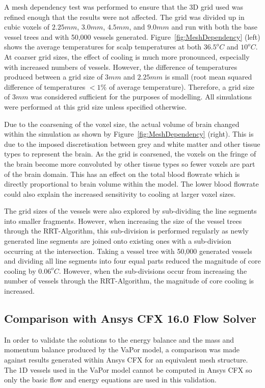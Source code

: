 \documentclass[11pt,english,a4paper,twoside,openright]{report}
\begin{document}
{{{{{{{{A mesh dependency test was performed to ensure that the 3D grid used was refined enough that the results were not affected. The grid was divided up in cubic voxels of $2.25mm$, $3.0mm$, $4.5mm$, and $9.0mm$ and run with both the base vessel trees and with 50,000 vessels generated. Figure~\ref{fig:MeshDependency} (left) shows the average temperatures for scalp temperatures at both $36.5^{o}C$ and $10^{o}C$. At coarser grid sizes, the effect of cooling is much more pronounced, especially with increased numbers of vessels. However, the difference of temperatures produced between a grid size of $3mm$ and $2.25mm$ is small (root mean squared difference of temperatures {$<$}$1\%$ of average temperature). Therefore, a grid size of $3mm$ was considered sufficient for the purposes of modelling. All simulations were performed at this grid size unless specified otherwise.

Due to the coarsening of the voxel size, the actual volume of brain changed within the simulation as shown by Figure~\ref{fig:MeshDependency} (right). This is due to the imposed discretisation between grey and white matter and other tissue types to represent the brain. As the grid is coarsened, the voxels on the fringe of the brain become more convoluted by other tissue types so fewer voxels are part of the brain domain. This has an effect on the total blood flowrate which is directly proportional to brain volume within the model. The lower blood flowrate could also explain the increased sensitivity to cooling at larger voxel sizes.

The grid sizes of the vessels were also explored by sub-dividing the line segments into smaller fragments. However, when increasing the size of the vessel trees through the RRT-Algorithm, this sub-division is performed regularly as newly generated line segments are joined onto existing ones with a sub-division occurring at the intersection. Taking a vessel tree with 50,000 generated vessels and dividing all line segments into four equal parts reduced the magnitude of core cooling by $0.06^{o}C$. However, when the sub-divisions occur from increasing the number of vessels through the RRT-Algorithm, the magnitude of core cooling is increased.  

\subsection{Comparison with Ansys CFX 16.0 Flow Solver}

In order to validate the solutions to the energy balance and the mass and momentum balance produced by the VaPor model, a comparison was made against results generated within Ansys CFX for an equivalent mesh structure. The 1D vessels used in the VaPor model cannot be computed in Ansys CFX so only the basic flow and energy equations are used in this validation.

}}}}}}}}
\end{document}
